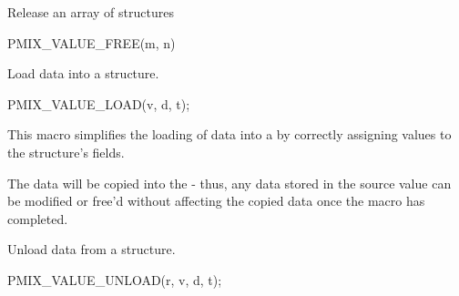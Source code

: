 
Release an array of  structures

\cspecificstart
\begin{codepar}
PMIX_VALUE_FREE(m, n)
\end{codepar}
\cspecificend

\begin{arglist}
\end{arglist}


\summary

Load data into a  structure.

\cspecificstart
\begin{codepar}
PMIX_VALUE_LOAD(v, d, t);
\end{codepar}
\cspecificend

\begin{arglist}
\end{arglist}

\descr

This macro simplifies the loading of data into a  by correctly assigning values to the structure's fields.

\adviceuserstart
The data will be copied into the  - thus, any data stored in the source value can be modified or free'd without affecting the copied data once the macro has completed.
\adviceuserend


\summary

Unload data from a  structure.

\cspecificstart
\begin{codepar}
PMIX_VALUE_UNLOAD(r, v, d, t);
\end{codepar}
\cspecificend

